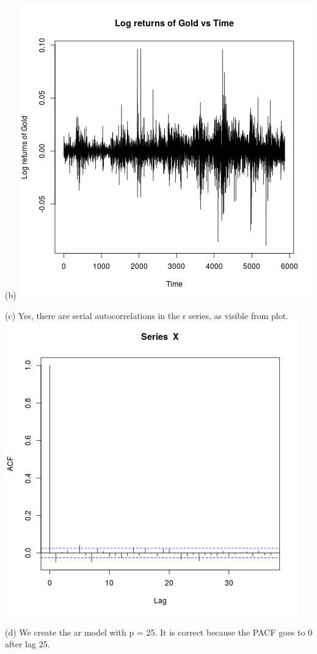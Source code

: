 \documentclass{article}
\begin{document}
(b)
\includegraphics{"plot1_b"}
\pagebreak

(c)
Yes, there are serial autocorrelations in the r series, as visible from plot.
\includegraphics{"plot1_c"}
\pagebreak

(d)
We create the ar model with p = 25. It is correct because the PACF goes to 0 after lag 25.
\end{document}
